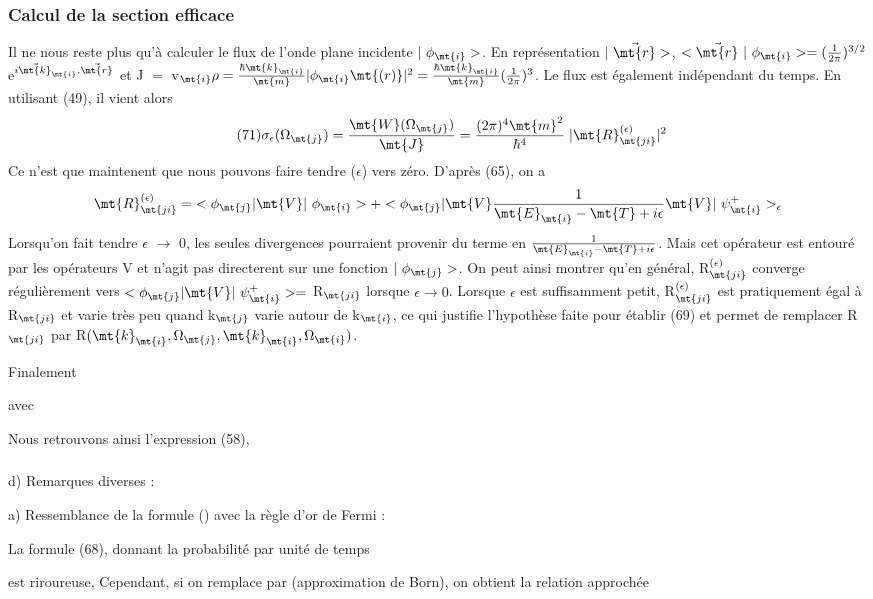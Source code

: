 \subsubsection{Calcul de la section efficace}%
Il ne nous reste plus qu'à calculer le flux de l'onde plane
incidente $|\ \phi_\mt{i}>$. En représentation $|\ \vec{\mt{r}}>$, $<\vec{\mt{r}}\ |\ \phi_\mt{i}>=
(\frac{1}{2\pi})^{3/2}$e$^{i\vec{\mt{k}}_\mt{i}.\vec{\mt{r}}}$ et J $=$ v$_\mt{i }\rho=
\frac{\hbar\mt{ k}_\mt{i}}{\mt{m}}|\phi_\mt{i}\mt{(r)}|^2=\frac{\hbar\mt{ k}_\mt{i}}{\mt{m}}(\frac{1}{2\pi})^3$.
Le flux est également indépendant du temps. En utilisant (49), il vient alors
\[
\tag{71}\sigma_\epsilon(\Omega_\mt{j})=\frac{\mt{W}(\Omega_\mt{j})}{\mt{J}}=\frac{(2\pi)^4\mt{m}^2}{\hbar^4}\;|\mt{R}_\mt{ji}^{(\epsilon)}|^2
\]
Ce n'est que maintenent que nous pouvons faire tendre ($\epsilon$) vers zéro.
D'après (65), on a
\[
\mt{R}_\mt{ji}^{(\epsilon)}=\;<\phi_\mt{j }|\mt{ V }|\ \phi_\mt{i}>+
<\phi_\mt{j }|\mt{ V }\frac{1}{\mt{E}_\mt{i}-\mt{T}+i\epsilon}\mt{ V }|\ \psi_\mt{i}^+>_\epsilon
\]
Lorsqu'on fait tendre $\epsilon$ $\to$ 0, les seules divergences pourraient provenir
du terme en $\frac{1}{\mt{E}_\mt{i}-\mt{T}+i\epsilon}$. Mais cet opérateur est entouré par les
opérateurs V et n'agit pas directerent sur une fonction $|\ \phi_\mt{j}>$.
On peut ainsi montrer qu'en général, R$_\mt{ji}^{(\epsilon)}$ converge régulièrement vers
$<\phi_\mt{j }|\mt{ V }|\ \psi_\mt{i}^+>=$ R$_\mt{ji}$
lorsque $\epsilon\to0$. Lorsque $\epsilon$ est suffisamment petit,
R$_\mt{ji}^{(\epsilon)}$ est pratiquement égal à R$_\mt{ji}$ et varie très peu quand k$_\mt{j}$ varie autour
de k$_\mt{i}$, ce qui justifie l'hypothèse faite pour établir (69) et permet de
remplacer R$_\mt{ji}$ par R$(\mt{k}_\mt{i},\Omega_\mt{j},\mt{k}_\mt{i},\Omega_\mt{i})$.

Finalement

avec 

Nous retrouvons ainsi l'expression (58),

\subsubsection{}%
d) Remarques diverses :

a) Ressemblance de la formule () avec la règle d'or de Fermi :

La formule (68), donnant la probabilité par unité de temps 

est riroureuse, Cependant, si on remplace  par 
(approximation de Born), on obtient la relation approchée


